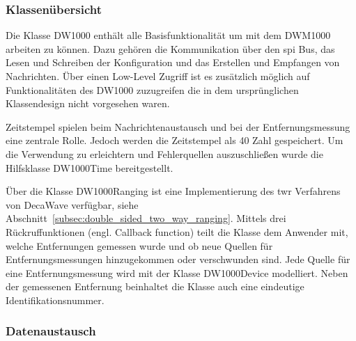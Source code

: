 

%
%
\subsubsection{Klassenübersicht}

Die Klasse DW1000 enthält alle Basisfunktionalität um mit dem DWM1000 arbeiten zu können. Dazu gehören die Kommunikation über den \Gls{spi} Bus, das Lesen und Schreiben der Konfiguration und das Erstellen und Empfangen von Nachrichten. Über einen Low-Level Zugriff ist es zusätzlich möglich auf Funktionalitäten des DW1000 zuzugreifen die in dem ursprünglichen Klassendesign nicht vorgesehen waren.

Zeitstempel spielen beim Nachrichtenaustausch und bei der Entfernungsmessung eine zentrale Rolle. Jedoch werden die Zeitstempel als \SI{40}{\bit} Zahl gespeichert. Um die Verwendung zu erleichtern und Fehlerquellen auszuschließen wurde die Hilfsklasse DW1000Time bereitgestellt.

Über die Klasse DW1000Ranging ist eine Implementierung des \Gls{twr} Verfahrens von DecaWave verfügbar, siehe Abschnitt~\ref{subsec:double_sided_two_way_ranging}. Mittels drei Rückruffunktionen (engl. Callback function) teilt die Klasse dem Anwender mit, welche Entfernungen gemessen wurde und ob neue Quellen für Entfernungsmessungen hinzugekommen oder verschwunden sind. Jede Quelle für eine Entfernungsmessung wird mit der Klasse DW1000Device modelliert. Neben der gemessenen Entfernung beinhaltet die Klasse auch eine eindeutige Identifikationsnummer. 


%
%
\subsubsection{Datenaustausch}

